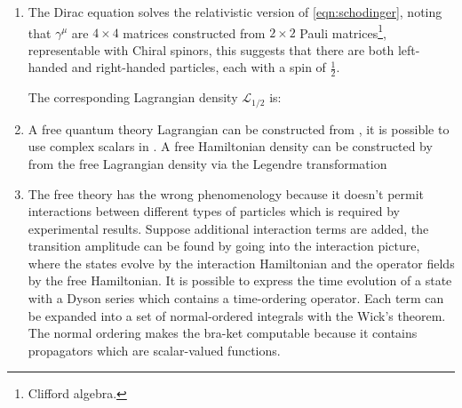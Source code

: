 \begin{enumerate}
        It is then possible to construct a Lagrangian density\footnote{
            Starting from here, to be more concise, ``Lagrangian'' is used
            in place of ``Lagrangian density''.
            Same for ``Hamiltonian'' in place of ``Hamiltonian density''.
        } $\mathcal{L}_\text{free}$
        that leads to the correct dynamical equations
        (i.e. Klein-Gordon and Dirac)
        by the Euler-Lagrange equation\footnote{
            That is:
            $\frac{\partial \mathcal{L}}{\partial \phi} - \partial_\mu (\frac{\partial \mathcal{L}}{\partial (\partial_\mu \phi)}) = 0$.
        }:

        \begin{equation}
            \mathcal{L}_\text{free} =
                \frac{1}{2} \partial_\mu \phi \partial^\mu \phi -
                \frac{1}{2} m \phi^2
        \end{equation}

    \item The Dirac equation solves the relativistic version of
        \cref{eqn:schodinger},
        noting that $\gamma^\mu$ are $4 \times 4$ matrices constructed from
        $2 \times 2$ Pauli matrices\footnote{
            Clifford algebra.
        },
        representable with Chiral spinors,
        this suggests that there are both left-handed and right-handed particles,
        each with a spin of $\frac{1}{2}$.

        The corresponding Lagrangian density $\mathcal{L}_{1/2}$ is:

    \item A free quantum theory Lagrangian can be constructed from ,
        it is possible to use complex scalars in .
        A free Hamiltonian density can be constructed by from the free
        Lagrangian density via the Legendre transformation

    \item The free theory has the wrong phenomenology because it doesn't permit
        interactions between different types of particles which is required by
        experimental results.
        Suppose additional interaction terms are added,
        the transition amplitude can be found by going into the interaction
        picture, where the states evolve by the interaction Hamiltonian
        and the operator fields by the free Hamiltonian.
        It is possible to express the time evolution of a state with a Dyson
        series which contains a time-ordering operator.
        Each term can be expanded into a set of normal-ordered integrals with
        the Wick's theorem.
        The normal ordering makes the bra-ket computable because it contains
        propagators which are scalar-valued functions.


\end{enumerate}

